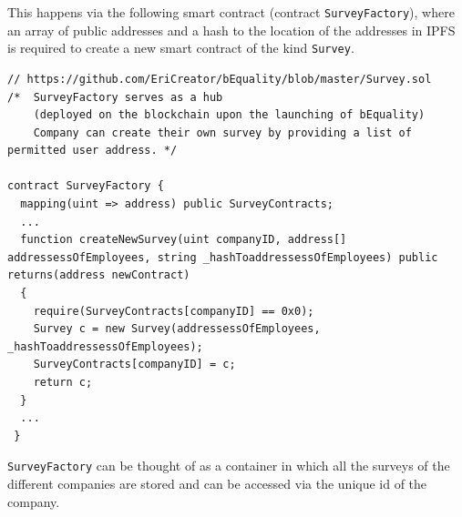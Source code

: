 This happens via the following smart contract (contract \texttt{SurveyFactory}), where an array of public addresses and a hash to the location of the addresses in IPFS is required to create a new smart contract of the kind \texttt{Survey}.\\
\begin{lstlisting}
// https://github.com/EriCreator/bEquality/blob/master/Survey.sol
/*	SurveyFactory serves as a hub 
	(deployed on the blockchain upon the launching of bEquality)
	Company can create their own survey by providing a list of permitted user address. */

contract SurveyFactory {
  mapping(uint => address) public SurveyContracts;
  ...
  function createNewSurvey(uint companyID, address[] addressessOfEmployees, string _hashToaddressessOfEmployees) public returns(address newContract)
  {
    require(SurveyContracts[companyID] == 0x0);
    Survey c = new Survey(addressessOfEmployees, _hashToaddressessOfEmployees);
    SurveyContracts[companyID] = c;
    return c;
  }
  ...
 }
\end{lstlisting}
\texttt{SurveyFactory} can be thought of as a container in which all the surveys of the different companies are stored and can be accessed via the unique id of the company.

